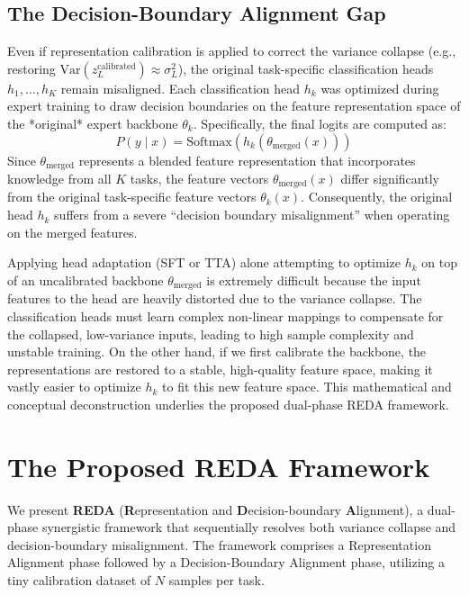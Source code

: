 \documentclass{article}
\theoremstyle{plain}
\theoremstyle{definition}
\theoremstyle{remark}
\begin{document}
\subsection{The Decision-Boundary Alignment Gap}
Even if representation calibration is applied to correct the variance collapse (e.g., restoring $\text{Var}(z_L^{\text{calibrated}}) \approx \sigma_L^2$), the original task-specific classification heads $h_1, \dots, h_K$ remain misaligned.
Each classification head $h_k$ was optimized during expert training to draw decision boundaries on the feature representation space of the *original* expert backbone $\theta_k$. 
Specifically, the final logits are computed as:
\begin{equation}
    P(y \mid x) = \text{Softmax}(h_k(\theta_{\text{merged}}(x)))
\end{equation}
Since $\theta_{\text{merged}}$ represents a blended feature representation that incorporates knowledge from all $K$ tasks, the feature vectors $\theta_{\text{merged}}(x)$ differ significantly from the original task-specific feature vectors $\theta_k(x)$. Consequently, the original head $h_k$ suffers from a severe ``decision boundary misalignment'' when operating on the merged features.

Applying head adaptation (SFT or TTA) alone attempting to optimize $h_k$ on top of an uncalibrated backbone $\theta_{\text{merged}}$ is extremely difficult because the input features to the head are heavily distorted due to the variance collapse. The classification heads must learn complex non-linear mappings to compensate for the collapsed, low-variance inputs, leading to high sample complexity and unstable training. On the other hand, if we first calibrate the backbone, the representations are restored to a stable, high-quality feature space, making it vastly easier to optimize $h_k$ to fit this new feature space. This mathematical and conceptual deconstruction underlies the proposed dual-phase REDA framework.

\section{The Proposed REDA Framework}
\label{sec:reda}

We present \textbf{REDA} (\textbf{R}epresentation and \textbf{D}ecision-boundary \textbf{A}lignment), a dual-phase synergistic framework that sequentially resolves both variance collapse and decision-boundary misalignment. The framework comprises a Representation Alignment phase followed by a Decision-Boundary Alignment phase, utilizing a tiny calibration dataset of $N$ samples per task.
\end{document}
